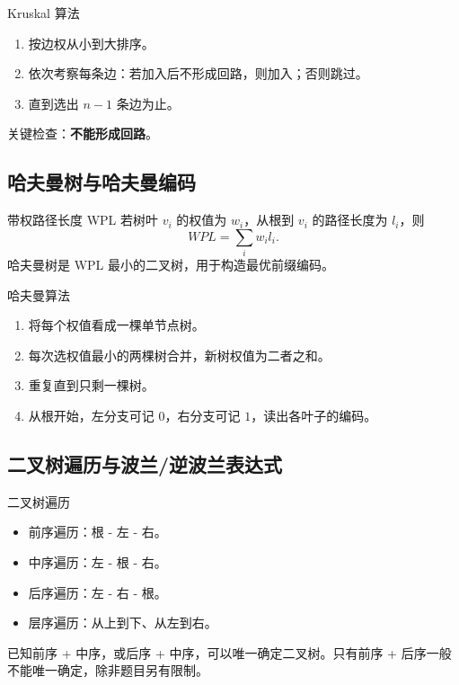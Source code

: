\documentclass[UTF8,zihao=-4]{ctexart}
\newcommand{\kw}[1]{\textbf{\color{main}#1}}
\begin{document}
\begin{methodbox}{Kruskal 算法}
\begin{enumerate}
  \item 按边权从小到大排序。
  \item 依次考察每条边：若加入后不形成回路，则加入；否则跳过。
  \item 直到选出 $n-1$ 条边为止。
\end{enumerate}
关键检查：\kw{不能形成回路}。
\end{methodbox}

\subsection{哈夫曼树与哈夫曼编码}

\begin{corebox}{带权路径长度 WPL}
若树叶 $v_i$ 的权值为 $w_i$，从根到 $v_i$ 的路径长度为 $l_i$，则
\[
WPL=\sum_i w_i l_i.
\]
哈夫曼树是 WPL 最小的二叉树，用于构造最优前缀编码。
\end{corebox}

\begin{methodbox}{哈夫曼算法}
\begin{enumerate}
  \item 将每个权值看成一棵单节点树。
  \item 每次选权值最小的两棵树合并，新树权值为二者之和。
  \item 重复直到只剩一棵树。
  \item 从根开始，左分支可记 $0$，右分支可记 $1$，读出各叶子的编码。
\end{enumerate}
\end{methodbox}

\subsection{二叉树遍历与波兰/逆波兰表达式}

\begin{corebox}{二叉树遍历}
\begin{itemize}
  \item 前序遍历：根 - 左 - 右。
  \item 中序遍历：左 - 根 - 右。
  \item 后序遍历：左 - 右 - 根。
  \item 层序遍历：从上到下、从左到右。
\end{itemize}
已知前序 + 中序，或后序 + 中序，可以唯一确定二叉树。只有前序 + 后序一般不能唯一确定，除非题目另有限制。
\end{corebox}
\end{document}
